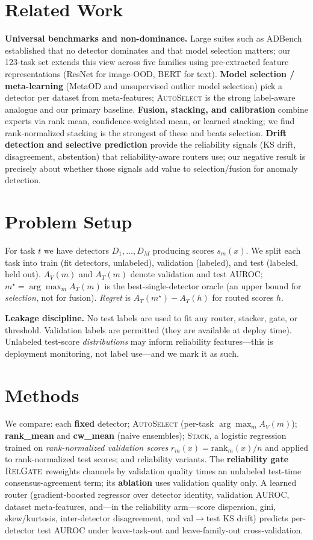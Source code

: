\documentclass[11pt]{article}
\newcommand{\stack}{\textsc{Stack}}
\newcommand{\auto}{\textsc{AutoSelect}}
\newcommand{\relg}{\textsc{RelGate}}
\begin{document}
\section{Related Work}
\textbf{Universal benchmarks and non-dominance.} Large suites such as ADBench
established that no detector dominates and that model selection matters; our 123-task
set extends this view across five families using pre-extracted feature
representations (ResNet for image-OOD, BERT for text). \textbf{Model selection /
meta-learning} (MetaOD and unsupervised outlier model selection) pick a detector per
dataset from meta-features; \auto{} is the strong label-aware analogue and our primary
baseline. \textbf{Fusion, stacking, and calibration} combine experts via rank mean,
confidence-weighted mean, or learned stacking; we find rank-normalized stacking is the
strongest of these and beats selection. \textbf{Drift detection and selective
prediction} provide the reliability signals (KS drift, disagreement, abstention) that
reliability-aware routers use; our negative result is precisely about whether those
signals add value to selection/fusion for anomaly detection.

\section{Problem Setup}
For task $t$ we have detectors $D_1,\dots,D_M$ producing scores $s_m(x)$. We split each
task into train (fit detectors, unlabeled), validation (labeled), and test (labeled,
held out). $A_V(m)$ and $A_T(m)$ denote validation and test AUROC; $m^\star=\arg\max_m
A_T(m)$ is the best-single-detector oracle (an upper bound for \emph{selection}, not
for fusion). \emph{Regret} is $A_T(m^\star)-A_T(h)$ for routed scores $h$.

\textbf{Leakage discipline.} No test labels are used to fit any router, stacker, gate,
or threshold. Validation labels are permitted (they are available at deploy time).
Unlabeled test-score \emph{distributions} may inform reliability features---this is
deployment monitoring, not label use---and we mark it as such.

\section{Methods}
We compare: each \textbf{fixed} detector; \auto{} (per-task $\arg\max_m A_V(m)$);
\textbf{rank\_mean} and \textbf{cw\_mean} (naive ensembles); \stack, a logistic
regression trained on \emph{rank-normalized validation scores} $r_m(x)=\mathrm{rank}_m(x)/n$
and applied to rank-normalized test scores; and reliability variants. The
\textbf{reliability gate} $\relg$ reweights channels by validation quality times an
unlabeled test-time consensus-agreement term; its \textbf{ablation} uses validation
quality only. A learned router (gradient-boosted regressor over detector identity,
validation AUROC, dataset meta-features, and---in the reliability arm---score
dispersion, gini, skew/kurtosis, inter-detector disagreement, and val$\to$test KS
drift) predicts per-detector test AUROC under leave-task-out and leave-family-out
cross-validation.
\end{document}
